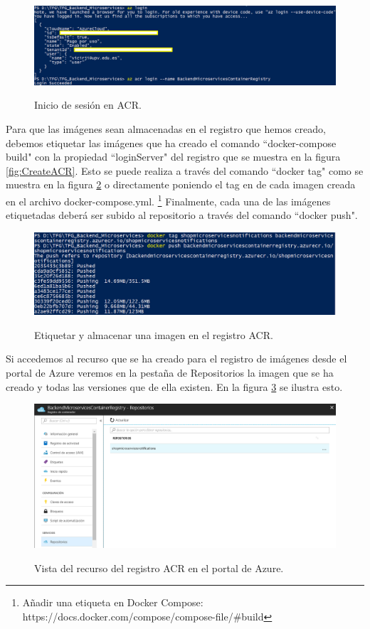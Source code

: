 \documentclass[11pt,spanish,listoffigures]{tfgetsinf}
\begin{document}
\begin{figure}[h]
\centering
\includegraphics[scale=0.50]{LoginAcr} \label{fig:LoginAcr}
\caption{Inicio de sesión en ACR.}
\end{figure}

Para que las imágenes sean almacenadas en el registro que hemos creado, debemos etiquetar las imágenes que ha creado el comando ``docker-compose build" con la propiedad ``loginServer" del registro que se muestra en la figura \ref{fig:CreateACR}. Esto se puede realiza a través del comando ``docker tag" como se muestra en la figura \ref{fig:PushImage} o directamente poniendo el tag en de cada imagen creada en el archivo docker-compose.yml. \footnote{Añadir una etiqueta en Docker Compose: https://docs.docker.com/compose/compose-file/\#build} Finalmente, cada una de las imágenes etiquetadas deberá ser subido al repositorio a través del comando ``docker push".

\begin{figure}[h]
\centering
\includegraphics[scale=0.6]{PushImage} \label{fig:PushImage}
\caption{Etiquetar y almacenar una imagen en el registro ACR.}
\end{figure}

Si accedemos al recurso que se ha creado para el registro de imágenes desde el portal de Azure veremos en la pestaña de Repositorios la imagen que se ha creado y todas las versiones que de ella existen. En la figura \ref{fig:RepositorioACR} se ilustra esto.

\begin{figure}[h]
\centering
\includegraphics[scale=0.5]{RepositorioACR} \label{fig:RepositorioACR}
\caption{Vista del recurso del registro ACR en el portal de Azure.}
\end{figure}
\end{document}
